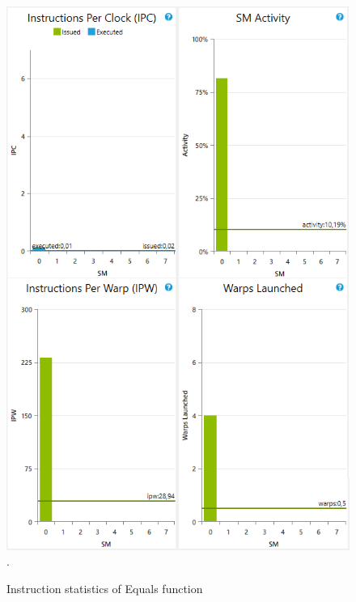 \documentclass[oneside,openright,12pt,final,en]{mgr}
\begin{document}
\begin{figure}[H]
	\centering
	\includegraphics[width=\textwidth]{equals_instructions}.
	\caption{Instruction statistics of Equals function}
	\label{fig:equals_instructions}
\end{figure}
\end{document}
